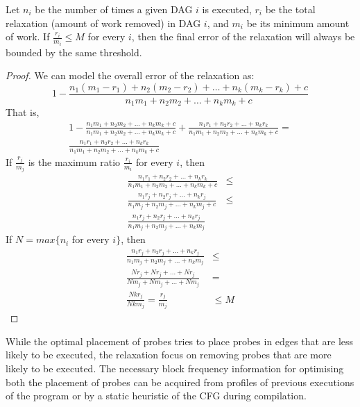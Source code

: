 \begin{prop}
Let $n_i$ be the number of times a given DAG $i$ is executed, $r_i$ be the total relaxation (amount of work removed) in DAG $i$, and $m_i$ be its minimum amount of work.
If $\frac{r_i}{m_i} \leq M$ for every $i$,
then the final error of the relaxation will always be bounded by the same threshold.
\end{prop}
\begin{proof}
We can model the overall error of the relaxation as:
\[
1 - \frac{n_1(m_1 - r_1) + n_2(m_2 - r_2) + \ldots + n_k(m_k - r_k) + c}{n_1m_1 + n_2m_2 + \ldots + n_km_k + c}
\]
That is,
\begin{gather*}
 1 - \frac{n_1m_1 + n_2m_2 + \ldots + n_km_k + c}{n_1m_1 + n_2m_2 + \ldots + n_km_k + c} + \frac{n_1r_1 + n_2r_2 + \ldots + n_kr_k}{n_1m_1 + n_2m_2 + \ldots + n_km_k + c} = \\
 \frac{n_1r_1 + n_2r_2 + \ldots + n_kr_k}{n_1m_1 + n_2m_2 + \ldots + n_km_k + c}
\end{gather*}
If $\frac{r_j}{m_j}$ is the maximum ratio $\frac{r_i}{m_i}$ for every $i$, then
\begin{equation*}
\begin{aligned}
 \frac{n_1r_1 + n_2r_2 + \ldots + n_kr_k}{n_1m_1 + n_2m_2 + \ldots + n_km_k + c} &\leq\\
 \frac{n_1r_j + n_2r_j + \ldots + n_kr_j}{n_1m_j + n_2m_j + \ldots + n_km_j + c} &\leq\\
 \frac{n_1r_j + n_2r_j + \ldots + n_kr_j}{n_1m_j + n_2m_j + \ldots + n_km_j} & 
\end{aligned}
\end{equation*}
If $N = max\{n_i$ for every $i\}$, then
\begin{equation*}
\begin{aligned}
 \frac{n_1r_j + n_2r_j + \ldots + n_kr_j}{n_1m_j + n_2m_j + \ldots + n_km_j} &\leq\\
 \frac{Nr_j + Nr_j + \ldots + Nr_j}{Nm_j + Nm_j + \ldots + Nm_j} &=\\
 \frac{Nkr_j}{Nkm_j} = \frac{r_j}{m_j} &\leq M
\end{aligned}
\end{equation*}
\end{proof}

While the optimal placement of probes tries to place probes in edges that are less likely to be executed, the relaxation focus on removing probes that are more likely to be executed.
The necessary block frequency information for optimising both the placement of probes can be acquired from profiles of previous executions of the program or by a static heuristic of the CFG during compilation.

